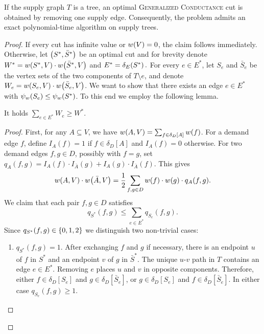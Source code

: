 \begin{theorem}\label{thm:tree-generalized-conductance}
  If the supply graph $T$ is a tree, an optimal \textsc{Generalized Conductance} cut is obtained by removing one supply edge. Consequently, the problem admits an exact polynomial-time algorithm on supply trees.
\end{theorem}
\begin{proof}
  If every cut has infinite value or $w\mathopen{}\left( V \right)=0$, the claim follows immediately. Otherwise, let $\mathopen{}\left( S^*,\bar{S}^* \right)$ be an optimal cut and for brevity denote $
    W^*=w\mathopen{}\left( S^*,V \right)\cdot w\mathopen{}\left( \bar{S}^*,V \right)$ and $ E^*=\delta_E\mathopen{}\left( S^* \right).$
  For every $e\in E^*$, let $S_e$ and $\bar{S}_e$ be the vertex sets of the two components of $T\setminus e$, and denote $
    W_e=w\mathopen{}\left( S_e,V \right)\cdot w\mathopen{}\left( \bar{S}_e,V \right)$. We want to show that there exists an edge $e\in E^*$ with $\psi_{w}\mathopen{}\left( S_e \right)\leq \psi_{w}\mathopen{}\left( S^* \right)$.
    To this end we employ the following lemma.
  \begin{lemma}\label{lemma:tree_edge_weight_sum}
    It holds $\sum_{e\in E^*}W_e\geq W^*$.
  \end{lemma}
  \begin{proof}
    First, for any $A\subseteq V$, we have $w\mathopen{}\left( A,V \right)=\sum_{f\in\delta_D[A]}w\mathopen{}\left( f \right)$.
    For a demand edge $f$, define $I_A(f)=1$ if $f\in\delta_D[A]$ and $I_A(f)=0$ otherwise. For two demand edges $f,g\in D$, possibly with $f=g$, set $q_A(f,g)=I_A(f)\cdot I_{\bar A}(g)+I_A(g)\cdot I_{\bar A}(f)$.
    This gives
    \begin{equation}\label{eq:tree-symmetrized-demand-pairs}
      w\mathopen{}\left( A,V \right)\cdot w\mathopen{}\left( \bar A,V \right)
      =\frac{1}{2}\sum_{f,g\in D}w\mathopen{}\left( f \right)\cdot w\mathopen{}\left( g \right)\cdot q_A(f,g).
    \end{equation}
    We claim that each pair $f,g\in D$ satisfies
    \begin{equation}\label{eq:tree-demand-pair-cover}
      q_{S^*}(f,g)
        \leq\sum_{e\in E^*}q_{S_e}(f,g).
    \end{equation}
    Since $q_{S^*}(f,g)\in \mathopen{}\left\{ 0,1,2 \right\}$ we distinguish two non-trivial cases:
    \begin{enumerate}
      \item $q_{S^*}(f,g)=1$. After exchanging $f$ and $g$ if necessary, there is an endpoint $u$ of $f$ in $S^*$ and an endpoint $v$ of $g$ in $\bar{S}^*$. The unique $u$-$v$ path in $T$ contains an edge $e\in E^*$. Removing $e$ places $u$ and $v$ in opposite components. Therefore, either $f\in\delta_D[S_e]$ and $g\in\delta_D[\bar S_e]$, or $g\in\delta_D[S_e]$ and $f\in\delta_D[\bar S_e]$. In either case $q_{S_e}(f,g)\geq 1$.

\end{enumerate}
\end{proof}
\end{proof}
